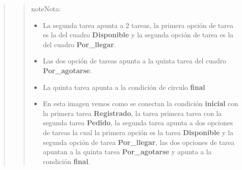 \documentclass[letterpaper,11pt,spanish]{sphinxmanual}
\begin{document}
\begin{quote}
\begin{quote}
\begin{notice}{note}{Nota:}
\begin{itemize}
\item {} 
La segunda tarea apunta a 2 tareas, la primera opción de tarea es la del cuadro \textbf{Disponible} y la segunda opción de tarea es la del cuadro \textbf{Por\_llegar}.

\item {} 
Las dos opción de tareas apunta a la quinta tarea del cuadro \textbf{Por\_agotarse}.

\item {} 
La quinta tarea apunta a la condición de circulo \textbf{final}

\item {} 
En esta imagen vemos como se conectan la condición  \textbf{inicial} con la primera tarea \textbf{Registrado}, la tarea primera tarea con la segunda tarea \textbf{Pedido}, la segunda tarea apunta a dos opciones de tareas la cual la primera opción es la tarea \textbf{Disponible} y la segunda opción de tarea \textbf{Por\_llegar}, las dos opciones de tarea apuntan a la quinta tarea \textbf{Por\_agotarse} y apunta a la condición \textbf{final}.

\end{itemize}
\end{notice}
\end{quote}
\end{quote}
\end{document}
